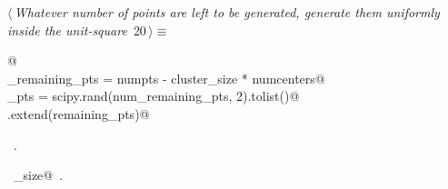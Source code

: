 \documentclass[11.5pt]{report}
\begin{document}
\vspace{-0.8cm} \newchunk
\begin{flushleft} \small
\begin{minipage}{\linewidth}\label{scrap21}\raggedright\small
{} $\langle\,${\itshape Whatever number of points are left to be generated, generate them uniformly inside the unit-square}\nobreak\ {\footnotesize {20}}$\,\rangle\equiv$
\vspace{-1ex}
\begin{list}{}{} \item
\mbox{}\verb@   @\\
\mbox{}\verb@num_remaining_pts = numpts - cluster_size * numcenters@\\
\mbox{}\verb@remaining_pts = scipy.rand(num_remaining_pts, 2).tolist()@\\
\mbox{}\verb@points.extend(remaining_pts)@\\
\mbox{}\verb@@{\NWsep}
\end{list}
\vspace{-1.5ex}
\footnotesize
\begin{list}{}{\setlength{\itemsep}{-\parsep}\setlength{\itemindent}{-\leftmargin}}
\item \NWtxtMacroRefIn\ .
\item \NWtxtIdentsUsed\nobreak\  \verb@cluster_size@\nobreak\ .
\item{}
\end{list}
\end{minipage}\vspace{4ex}
\end{flushleft}
\end{document}
